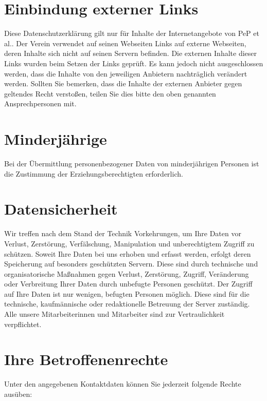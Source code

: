 \documentclass[
  fontsize=12pt,
  paper=a4,
  DIV14,
  parskip,
]{scrartcl}
\begin{document}
\section{Einbindung externer Links}

Diese Datenschutzerklärung gilt nur für Inhalte der Internetangebote von PeP
et al.. Der Verein verwendet auf seinen Webseiten Links auf externe
Webseiten, deren Inhalte sich nicht auf seinen Servern befinden.
Die externen Inhalte dieser Links wurden beim Setzen der Links geprüft.
Es kann jedoch nicht ausgeschlossen werden, dass die Inhalte von den
jeweiligen Anbietern nachträglich verändert werden.
Sollten Sie bemerken, dass die Inhalte der externen Anbieter gegen geltendes
Recht verstoßen, teilen Sie dies bitte den oben genannten Ansprechpersonen
mit.

\section{Minderjährige}

Bei der Übermittlung personenbezogener Daten von minderjährigen Personen ist
die Zustimmung der Erziehungsberechtigten erforderlich.

\section{Datensicherheit}

Wir treffen nach dem Stand der Technik Vorkehrungen, um Ihre Daten vor
Verlust, Zerstörung, Verfälschung, Manipulation und unberechtigtem Zugriff zu
schützen.
Soweit Ihre Daten bei uns erhoben und erfasst werden, erfolgt deren
Speicherung auf besonders geschützten Servern. Diese sind durch technische
und organisatorische Maßnahmen gegen Verlust, Zerstörung, Zugriff,
Veränderung oder Verbreitung Ihrer Daten durch unbefugte Personen geschützt.
Der Zugriff auf Ihre Daten ist nur wenigen, befugten Personen möglich. Diese
sind für die technische, kaufmännische oder redaktionelle Betreuung der
Server zuständig. Alle unsere Mitarbeiterinnen und Mitarbeiter sind zur
Vertraulichkeit verpflichtet.

\section{Ihre Betroffenenrechte}

Unter den angegebenen Kontaktdaten können Sie jederzeit folgende Rechte
ausüben:
\end{document}
